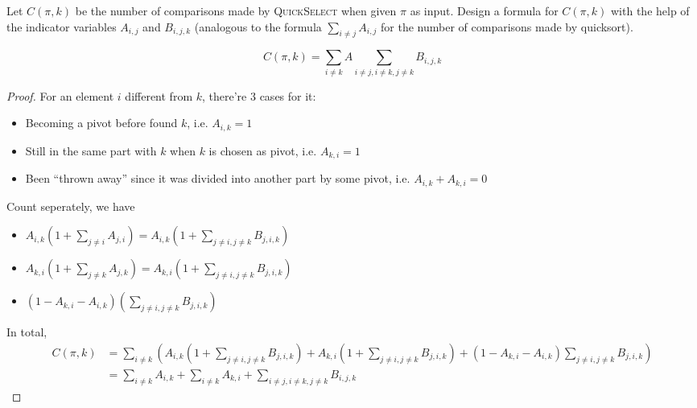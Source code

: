 \documentclass[11pt,a4paper,oneside]{article}
\begin{document}
\begin{problem}{7}
\statement
Let $C(\pi,k)$ be the number of comparisons made by \textsc{QuickSelect} when given
$\pi$ as input. Design a formula for $C(\pi,k)$ with the help of the indicator
variables $A_{i,j}$ and $B_{i,j,k}$ (analogous to the formula 
$\sum_{i \ne j} A_{i,j}$ for the number of comparisons made by quicksort).

\solution
\begin{lemma}
$$C(\pi,k)=\sum_{i \ne k} A\sum_{i \ne j,i \ne k,j\ne k} B_{i,j,k}$$
\end{lemma}
\begin{proof}

For an element $i$ different from $k$, there're $3$ cases for it:
\begin{itemize}
	\item Becoming a pivot before found $k$, i.e. $A_{i, k} = 1$
	\item Still in the same part with $k$ when $k$ is chosen as pivot, i.e. $A_{k, i} = 1$
	\item Been ``thrown away'' since it was divided into another part by some pivot, i.e. $A_{i, k} + A_{k, i} = 0$
\end{itemize}

Count seperately, we have
\begin{itemize}
	\item $A_{i, k} (1 + \sum_{j \neq i} A_{j, i}) = A_{i, k} (1 + \sum_{j \neq i, j \neq k} B_{j, i, k})$
	\item $A_{k, i} (1 + \sum_{j \neq k} A_{j, k}) = A_{k, i} (1 + \sum_{j \neq i, j \neq k} B_{j, i, k})$
	\item $(1 - A_{k, i} - A_{i, k})(\sum_{j \neq i, j \neq k} B_{j, i, k})$
\end{itemize}

In total,
\begin{align*}
	C(\pi,k) &= \sum_{i \neq k} (A_{i, k} (1 + \sum_{j \neq i, j \neq k} B_{j, i, k}) +A_{k, i} (1 + \sum_{j \neq i, j \neq k} B_{j, i, k}) +(1 - A_{k, i} - A_{i, k})\sum_{j \neq i, j \neq k} B_{j, i, k}) \\
	&= \sum_{i \ne k} A_{i,k}+\sum_{i \ne k} A_{k,i}+\sum_{i \ne j,i \ne k,j\ne k} B_{i,j,k}
\end{align*}

\end{proof}
\end{problem}
\end{document}
